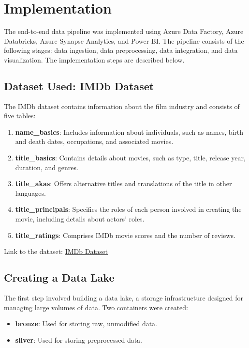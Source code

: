 \documentclass[a4paper,12pt]{article}
\begin{document}
\section{Implementation}
\label{sec:implementation}

The end-to-end data pipeline was implemented using Azure Data Factory, Azure Databricks, Azure Synapse Analytics, and Power BI. The pipeline consists of the following stages: data ingestion, data preprocessing, data integration, and data visualization. The implementation steps are described below.

\subsection{Dataset Used: IMDb Dataset}

The IMDb dataset contains information about the film industry and consists of five tables:
\begin{enumerate}
    \item \textbf{name\_basics}: Includes information about individuals, such as names, birth and death dates, occupations, and associated movies.
    \item \textbf{title\_basics}: Contains details about movies, such as type, title, release year, duration, and genres.
    \item \textbf{title\_akas}: Offers alternative titles and translations of the title in other languages.
    \item \textbf{title\_principals}: Specifies the roles of each person involved in creating the movie, including details about actors' roles.
    \item \textbf{title\_ratings}: Comprises IMDb movie scores and the number of reviews.
\end{enumerate}

Link to the dataset: \href{https://www.kaggle.com/datasets/ashirwadsangwan/imdb-dataset/data}{IMDb Dataset}

\subsection{Creating a Data Lake}
The first step involved building a data lake, a storage infrastructure designed for managing large volumes of data. Two containers were created:
\begin{itemize}
    \item \textbf{bronze}: Used for storing raw, unmodified data.
    \item \textbf{silver}: Used for storing preprocessed data.
\end{itemize}
\end{document}

